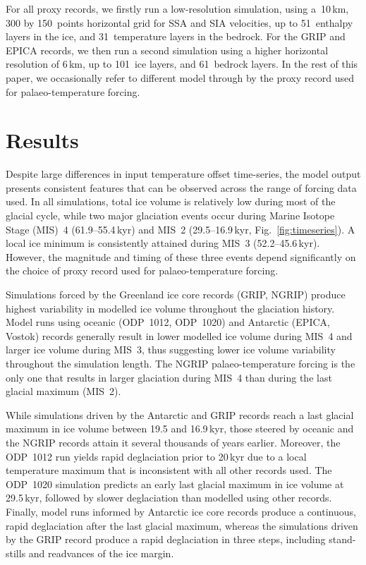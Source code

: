 \documentclass[tc, manuscript]{copernicus}
\begin{document}
For all proxy records, we firstly run a low-resolution simulation, using
a~10\,km, 300 by 150~points horizontal grid for SSA and SIA velocities,
up to 51~enthalpy layers in the ice, and 31~temperature layers in the bedrock.
For the GRIP and EPICA records, we then run a second simulation using a higher
horizontal resolution of 6\,km, up to 101~ice layers, and 61~bedrock
layers. In the rest of this paper, we occasionally refer to different model
through by the proxy record used for palaeo-temperature forcing.


\section{Results}
\label{sec:results}

Despite large differences in input temperature offset time-series, the model
output presents consistent features that can be observed across the range of
forcing data used. In all simulations, total ice volume is relatively low
during most of the glacial cycle, while two major glaciation events occur
during Marine Isotope Stage (MIS)~4 (61.9--55.4\,kyr) and MIS~2
(29.5--16.9\,kyr, Fig.~\ref{fig:timeseries}). A local ice minimum is
consistently attained during MIS~3 (52.2--45.6\,kyr). However, the
magnitude and timing of these three events depend significantly on the choice
of proxy record used for palaeo-temperature forcing.

Simulations forced by the Greenland ice core records (GRIP, NGRIP) produce
highest variability in modelled ice volume throughout the glaciation history.
Model runs using oceanic (ODP~1012, ODP~1020) and Antarctic (EPICA, Vostok)
records generally result in lower
modelled ice volume during MIS~4 and larger ice volume during MIS~3, thus
suggesting lower ice volume variability throughout the simulation length. The
NGRIP palaeo-temperature forcing is the only one that results in larger
glaciation during MIS~4 than during the last glacial maximum (MIS~2).

While simulations driven by the Antarctic and GRIP records
reach a last glacial maximum in ice volume between 19.5 and 16.9\,kyr,
those steered by oceanic and the NGRIP records attain it
several thousands of years earlier. Moreover, the ODP~1012 run yields rapid
deglaciation prior to 20\,kyr due to a local temperature maximum that is
inconsistent with all other records used. The ODP~1020 simulation predicts an
early last glacial maximum in ice volume at 29.5\,kyr, followed by
slower deglaciation than modelled using other records. Finally, model runs
informed by Antarctic ice core records produce a continuous, rapid deglaciation
after the last glacial maximum, whereas the simulations driven by the GRIP
record produce a rapid deglaciation in three steps, including stand-stills and
readvances of the ice margin.
\end{document}
